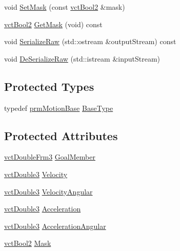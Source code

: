 \begin{DoxyCompactItemize}
void \hyperlink{classprm_position_cartesian_set_ac124e153f424a8bc82ade814174e1bd7}{Set\+Mask} (const \hyperlink{vct_fixed_size_vector_types_8h_ab49415a9643a1ee037f2a036058caeaa}{vct\+Bool2} \&mask)
\item 
\hyperlink{vct_fixed_size_vector_types_8h_ab49415a9643a1ee037f2a036058caeaa}{vct\+Bool2} \hyperlink{classprm_position_cartesian_set_a6387dc6119064e7a2e1bcb782de73e20}{Get\+Mask} (void) const 
\item 
void \hyperlink{classprm_position_cartesian_set_a3c1923c0aa5324783b2a81088cb7698d}{Serialize\+Raw} (std\+::ostream \&output\+Stream) const 
\item 
void \hyperlink{classprm_position_cartesian_set_ab2717495d22e9071d8606b14c5d71c9b}{De\+Serialize\+Raw} (std\+::istream \&input\+Stream)
\end{DoxyCompactItemize}
\subsection*{Protected Types}
\begin{DoxyCompactItemize}
\item 
typedef \hyperlink{classprm_motion_base}{prm\+Motion\+Base} \hyperlink{classprm_position_cartesian_set_ad8d7923e983724ee18081a6fcf1ebce8}{Base\+Type}
\end{DoxyCompactItemize}
\subsection*{Protected Attributes}
\begin{DoxyCompactItemize}
\item 
\hyperlink{vct_transformation_types_8h_acc33ebdc1b58783aa59508c7b5200b56}{vct\+Double\+Frm3} \hyperlink{classprm_position_cartesian_set_afa8b6da3bc44612f35332ad2c8d09bc1}{Goal\+Member}
\item 
\hyperlink{vct_fixed_size_vector_types_8h_a4a89122c9d7f72c3f31fe8126e17c3af}{vct\+Double3} \hyperlink{classprm_position_cartesian_set_a218381fcba3a988483998be35d62e855}{Velocity}
\item 
\hyperlink{vct_fixed_size_vector_types_8h_a4a89122c9d7f72c3f31fe8126e17c3af}{vct\+Double3} \hyperlink{classprm_position_cartesian_set_a3dc6dc353b6f68440b1784352aba06d9}{Velocity\+Angular}
\item 
\hyperlink{vct_fixed_size_vector_types_8h_a4a89122c9d7f72c3f31fe8126e17c3af}{vct\+Double3} \hyperlink{classprm_position_cartesian_set_a6144a72c9905a29333b7943fabd93150}{Acceleration}
\item 
\hyperlink{vct_fixed_size_vector_types_8h_a4a89122c9d7f72c3f31fe8126e17c3af}{vct\+Double3} \hyperlink{classprm_position_cartesian_set_a0c8c1b02ab4feb3961921d7ce49f1657}{Acceleration\+Angular}
\item 
\hyperlink{vct_fixed_size_vector_types_8h_ab49415a9643a1ee037f2a036058caeaa}{vct\+Bool2} \hyperlink{classprm_position_cartesian_set_aa9dcc7db15cd8fc1417d0db5ddc0aec7}{Mask}
\end{DoxyCompactItemize}
